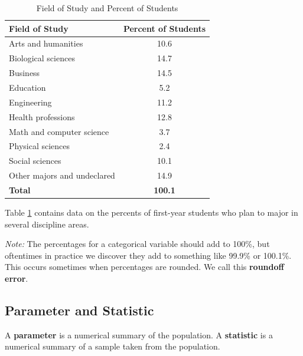 \begin{table}[h!]
\centering
\begin{tabular}{|l|c|}
\hline
\textbf{Field of Study}             & \textbf{Percent of Students} \\ \hline
Arts and humanities                 & 10.6                         \\ \hline
Biological sciences                 & 14.7                         \\ \hline
Business                            & 14.5                         \\ \hline
Education                           & 5.2                          \\ \hline
Engineering                         & 11.2                         \\ \hline
Health professions                  & 12.8                         \\ \hline
Math and computer science           & 3.7                          \\ \hline
Physical sciences                   & 2.4                          \\ \hline
Social sciences                     & 10.1                         \\ \hline
Other majors and undeclared         & 14.9                         \\ \hline
\textbf{Total}                      & \textbf{100.1}               \\ \hline
\end{tabular}
\caption{Field of Study and Percent of Students}
\label{tab:field_of_study}
\end{table}


Table \ref{tab:field_of_study} contains data on the percents of first-year students who plan to major in several discipline areas.

\emph{Note:} The percentages for a categorical variable should add to 100\%, but oftentimes in practice we discover they add to something like 99.9\% or 100.1\%. This occurs sometimes when percentages are rounded. We call this \textbf{roundoff error}.

\subsection{Parameter and Statistic}
A \textbf{parameter} is a numerical summary of the population. A \textbf{statistic} is a numerical summary of a sample taken from the population.

